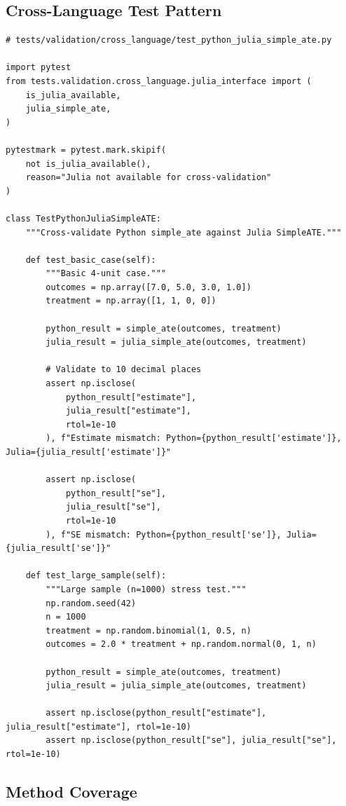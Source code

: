 \subsection{Cross-Language Test Pattern}

\begin{verbatim}
# tests/validation/cross_language/test_python_julia_simple_ate.py

import pytest
from tests.validation.cross_language.julia_interface import (
    is_julia_available,
    julia_simple_ate,
)

pytestmark = pytest.mark.skipif(
    not is_julia_available(),
    reason="Julia not available for cross-validation"
)

class TestPythonJuliaSimpleATE:
    """Cross-validate Python simple_ate against Julia SimpleATE."""

    def test_basic_case(self):
        """Basic 4-unit case."""
        outcomes = np.array([7.0, 5.0, 3.0, 1.0])
        treatment = np.array([1, 1, 0, 0])

        python_result = simple_ate(outcomes, treatment)
        julia_result = julia_simple_ate(outcomes, treatment)

        # Validate to 10 decimal places
        assert np.isclose(
            python_result["estimate"],
            julia_result["estimate"],
            rtol=1e-10
        ), f"Estimate mismatch: Python={python_result['estimate']}, Julia={julia_result['estimate']}"

        assert np.isclose(
            python_result["se"],
            julia_result["se"],
            rtol=1e-10
        ), f"SE mismatch: Python={python_result['se']}, Julia={julia_result['se']}"

    def test_large_sample(self):
        """Large sample (n=1000) stress test."""
        np.random.seed(42)
        n = 1000
        treatment = np.random.binomial(1, 0.5, n)
        outcomes = 2.0 * treatment + np.random.normal(0, 1, n)

        python_result = simple_ate(outcomes, treatment)
        julia_result = julia_simple_ate(outcomes, treatment)

        assert np.isclose(python_result["estimate"], julia_result["estimate"], rtol=1e-10)
        assert np.isclose(python_result["se"], julia_result["se"], rtol=1e-10)
\end{verbatim}

\subsection{Method Coverage}

